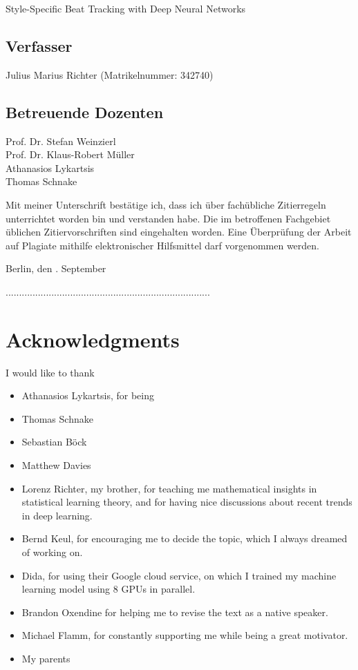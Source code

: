 \documentclass{scrartcl}
\begin{document}
Style-Specific Beat Tracking with Deep Neural Networks

\vspace{1em}
\subsection*{Verfasser}

Julius Marius Richter (Matrikelnummer: 342740)

\vspace{1em}
\subsection*{Betreuende Dozenten}

Prof. Dr. Stefan Weinzierl \\
Prof. Dr. Klaus-Robert Müller \\
Athanasios Lykartsis \\
Thomas Schnake 

\vspace{3em}

\noindent Mit meiner Unterschrift bestätige ich, dass ich über fachübliche Zi\-tier\-regeln unterrich\-tet worden bin und verstanden habe. Die im betroffenen Fachgebiet üblichen Zi\-tier\-vorschriften sind eingehalten worden. Eine Überprüfung der Arbeit auf Plagiate mithilfe elektronischer Hilfsmittel darf vorgenommen werden. 

\vspace{4em}
\noindent Berlin, den \the\day. September \the\year

\vspace{3em}
\noindent............................................................................

\newpage 

\section*{Acknowledgments}
I would like to thank
\begin{itemize}
\item Athanasios Lykartsis, for being 
\item Thomas Schnake
\item Sebastian Böck
\item Matthew Davies 
\item Lorenz Richter, my brother, for teaching me mathematical insights in statistical learning theory, and for having nice discussions about recent trends in deep learning. 
\item Bernd Keul, for encouraging me to decide the topic, which I always dreamed of working on. 
\item Dida, for using their Google cloud service, on which I trained my machine learning model using 8 GPUs in parallel.
\item Brandon Oxendine for helping me to revise the text as a native speaker. 
\item Michael Flamm, for constantly supporting me while being a great motivator.  
\item My parents 
\end{itemize}
\end{document}
